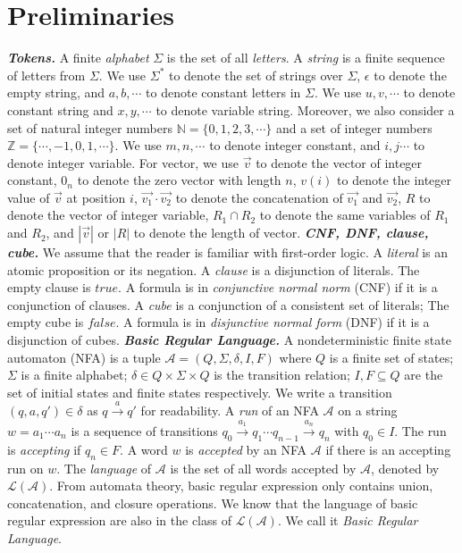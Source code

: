 \documentclass[runningheads]{llncs}
\newcommand*{\myvec}[1]{\vec{#1}}
\newcommand*{\lan}{\mathcal{L}}
\newcommand*{\highlight}[1]{\textbf{\textit{#1}}}
\newcommand*{\aut}{\mathcal{A}}
\begin{document}
\section{Preliminaries} \label{sec:pre}
\highlight{Tokens.} A finite \emph{alphabet} $\Sigma$ is the set of all \emph{letters}. A
\emph{string} is a finite sequence of letters from $\Sigma$. We use $\Sigma^*$ to
denote the set of strings over $\Sigma$, $\epsilon$ to denote the empty string, and $a,
  b,\cdots$ to denote constant letters in $\Sigma$. We use $u, v,\cdots$ to denote constant
string and $x, y,\cdots$ to denote variable string. Moreover, we also consider a set of natural integer numbers $\mathbb{N} = \{0,1,2,3,\cdots\}$ and a set of integer numbers $\mathbb{Z}= \{\cdots, -1, 0, 1, \cdots\}$. We use $m,n,\cdots$ to
denote integer constant, and $i,j\cdots$ to denote integer variable. For vector, we use $\myvec{v}$ to denote the vector of integer constant, $0_n$ to denote the zero vector with length $n$, $v(i)$ to denote the integer value of $\myvec{v}$ at position $i$, $\myvec{v_1}\cdot\myvec{v_2}$ to denote the concatenation of $\myvec{v_1}$ and $\myvec{v_2}$, $R$ to denote the vector of integer variable, $R_1 \cap R_2$ to denote the same variables of $R_1$ and $R_2$, and $|\myvec{v}|$ or $|R|$ to denote the length of vector.\newline
\highlight{CNF, DNF, clause, cube.} We assume that the reader is familiar with first-order logic. A \emph{literal} is an atomic proposition or its negation. A \emph{clause} is a disjunction of literals. The empty clause is $true$. A formula is in \emph{conjunctive normal norm} (CNF) if it is a conjunction of clauses. A \emph{cube} is a conjunction of a consistent set of literals; The empty cube is $false$. A formula is in \emph{disjunctive normal form} (DNF) if it is a disjunction of cubes.\newline
\highlight{Basic Regular Language.} A nondeterministic finite state automaton (NFA) is a tuple $\aut=(Q, \Sigma, \delta, I, F)$ where $Q$ is a finite set of states; $\Sigma$ is a finite alphabet; $\delta\in Q\times\Sigma\times Q$ is the transition relation; $I, F\subseteq Q$ are the set of initial states and finite states respectively. We write a transition $(q, a, q') \in \delta$ as $q\xrightarrow{a} q'$ for readability. A \emph{run} of an NFA $\aut$ on a string $w = a_1\cdots a_n$ is a sequence of transitions $q_0\xrightarrow{a_1}q_1\cdots q_{n-1}\xrightarrow{a_n}q_n$ with $q_0\in I$. The run is \emph{accepting} if $q_{n}\in F$. A word $w$ is \emph{accepted} by an NFA $\aut$ if there is an accepting run on $w$. The \emph{language} of $\aut$ is the set of all words accepted by $\aut$, denoted by $\lan(\aut)$. From automata theory\cite{aut_hopcraft}, basic regular expression only contains union, concatenation, and closure operations. We know that the language of basic regular expression are also in the class of $\lan(\aut)$. We call it \emph{Basic Regular Language}.
\end{document}
